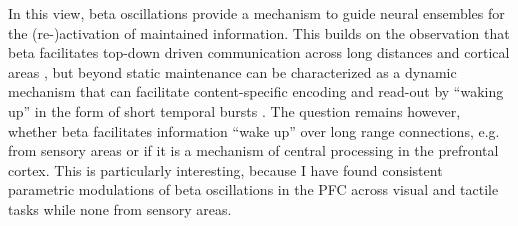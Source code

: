In this view, beta oscillations provide a mechanism to guide neural ensembles for the (re-)activation of maintained information. This builds on the observation that beta facilitates top-down driven communication across long distances and cortical areas \parencite{Antzoulatos2016,Arnal2012,Bastos2015,Engel2010,Michalareas2016,Sejnowski2006,Siegel2012,Varela2001,Wang2010}, but beyond static maintenance can be characterized as a dynamic mechanism that can facilitate content-specific encoding and read-out by “waking up” in the form of short temporal bursts \parencite{Fries2015,Jones2016,Lundqvist2018,Spitzer2017}. The question remains however, whether beta facilitates information “wake up” over long range connections, e.g. from sensory areas or if it is a mechanism of central processing in the prefrontal cortex. This is particularly interesting, because I have found consistent parametric modulations of beta oscillations in the PFC across visual and tactile tasks while none from sensory areas.

